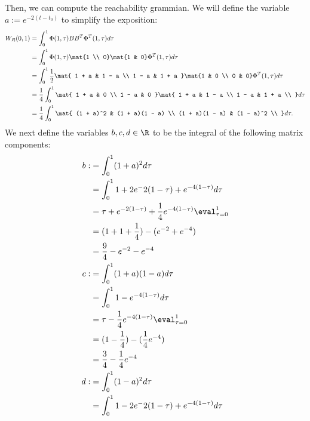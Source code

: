 \documentclass{homework}
\begin{document}
\begin{letterenum}
Then, we can compute the reachability grammian. We will define
the variable $a := e^{-2(t - t_0)}$ to simplify the exposition:
\begin{align*}
    W_R(0, 1) &= \int_{0}^{1} \Phi(1, \tau) B B^T \Phi^T(1, \tau) d\tau \\
        &= \int_{0}^{1} \Phi(1, \tau) \mat{1 \\ 0} \mat{1 & 0} \Phi^T(1, \tau) d\tau \\
        &= \int_{0}^{1} \frac{1}{2} \mat{
            1 + a & 1 - a \\
            1 - a & 1 + a
        } \mat{1 & 0 \\ 0 & 0} \Phi^T(1, \tau) d\tau \\
        &= \frac{1}{4} \int_{0}^{1} \mat{
            1 + a & 0 \\
            1 - a & 0 
        } \mat{
            1 + a & 1 - a \\
            1 - a & 1 + a \\
        } d\tau \\
        &= \frac{1}{4} \int_{0}^{1} \mat{
            (1 + a)^2 & (1 + a)(1 - a) \\
            (1 + a)(1 - a) & (1 - a)^2 \\
        } d\tau.
\end{align*}
We next define the variables $b,c,d\in\R$ to be the integral of the following matrix components:
\begin{align*}
    b :&= \int_{0}^{1} (1 + a)^2 d\tau  \\
        &= \int_{0}^{1} 1 + 2 e^-2(1 - \tau) + e^{-4(1 - \tau)} d\tau \\
        &= \tau + e^{-2(1-\tau)} + \frac{1}{4} e^{-4(1-\tau)} \eval_{\tau = 0}^1 \\
        &= (1 + 1 + \frac{1}{4}) - (e^{-2} + e^{-4}) \\
        &= \frac{9}{4} - e^{-2} - e^{-4} \\
    c :&= \int_{0}^{1} (1 + a)(1 - a) d\tau  \\
        &= \int_{0}^{1} 1 - e^{-4(1 - \tau)} d\tau \\
        &= \tau - \frac{1}{4} e^{-4(1-\tau)} \eval_{\tau = 0}^1 \\
        &= (1 - \frac{1}{4}) - (\frac{1}{4} e^{-4}) \\
        &= \frac{3}{4} - \frac{1}{4} e^{-4} \\
    d :&= \int_{0}^{1} (1 - a)^2 d\tau  \\
        &= \int_{0}^{1} 1 - 2 e^-2(1 - \tau) + e^{-4(1 - \tau)} d\tau \\

\end{align*}
\end{letterenum}
\end{document}
